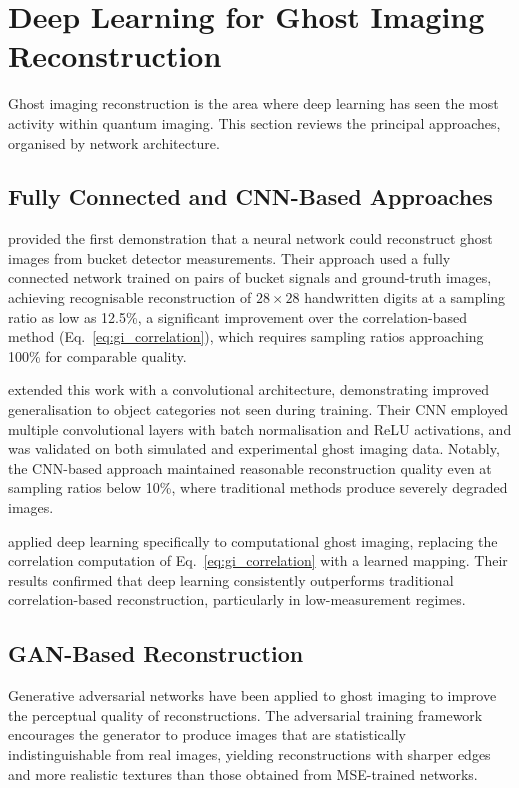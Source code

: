 \section{Deep Learning for Ghost Imaging Reconstruction}
\label{sec:ghost_imaging}

Ghost imaging reconstruction is the area where deep learning has seen the most activity within quantum imaging. This section reviews the principal approaches, organised by network architecture.

\subsection{Fully Connected and CNN-Based Approaches}

\citet{lyu2017} provided the first demonstration that a neural network could reconstruct ghost images from bucket detector measurements. Their approach used a fully connected network trained on pairs of bucket signals and ground-truth images, achieving recognisable reconstruction of $28 \times 28$ handwritten digits at a sampling ratio as low as 12.5\%, a significant improvement over the correlation-based method (Eq.~\ref{eq:gi_correlation}), which requires sampling ratios approaching 100\% for comparable quality.

\citet{he2018} extended this work with a convolutional architecture, demonstrating improved generalisation to object categories not seen during training. Their CNN employed multiple convolutional layers with batch normalisation and ReLU activations, and was validated on both simulated and experimental ghost imaging data. Notably, the CNN-based approach maintained reasonable reconstruction quality even at sampling ratios below 10\%, where traditional methods produce severely degraded images.

\citet{shimobaba2018} applied deep learning specifically to computational ghost imaging, replacing the correlation computation of Eq.~\eqref{eq:gi_correlation} with a learned mapping. Their results confirmed that deep learning consistently outperforms traditional correlation-based reconstruction, particularly in low-measurement regimes.

\subsection{GAN-Based Reconstruction}

Generative adversarial networks \citep{goodfellow2014} have been applied to ghost imaging to improve the perceptual quality of reconstructions. The adversarial training framework encourages the generator to produce images that are statistically indistinguishable from real images, yielding reconstructions with sharper edges and more realistic textures than those obtained from MSE-trained networks.

